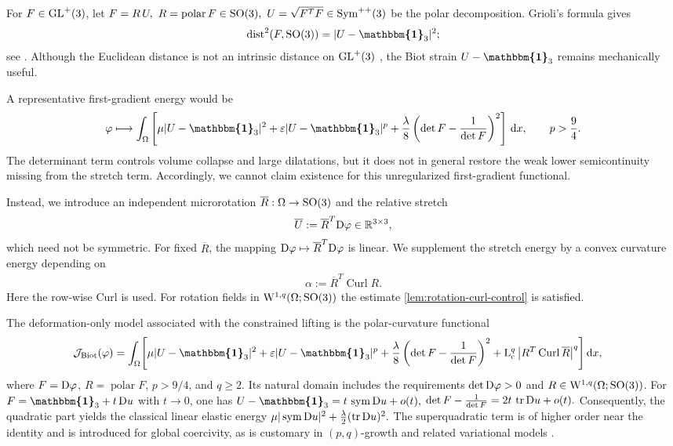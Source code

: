 \documentclass[11pt]{article}
\newcommand{\id}{{\boldsymbol{\mathbbm{1}}}}
\begin{document}
For $F\in {\rm GL}^+(3)$, let
$
F=R \,U,
\ 
R=\operatorname{polar}F\in {\rm SO}(3),
\ 
U=\sqrt{F^TF}\in\operatorname{Sym}^{++}(3)
$
be the polar decomposition. Grioli's formula gives
\begin{align}
\operatorname{dist}^2(F,{\rm SO}(3))
=
|U-\id_3|^2;
\end{align}
see \cite{Grioli40,agn_neff2014grioli}. Although the Euclidean distance is not an intrinsic distance on ${\rm GL}^+(3)$ \cite{agn_neff2014riemannian,agn_neff2015geometry,agn_martin2014minimal}, the Biot strain $U-\id_3$ remains mechanically useful.

A representative first-gradient energy would be
\begin{align}
\varphi\longmapsto
\int_\Omega
\left[
\mu|U-\id_3|^2
+
\varepsilon|U-\id_3|^p
+
\frac{\lambda}{8}
\left(\det F-\frac1{\det F}\right)^2
\right]\,\mathrm dx,
\qquad p>\frac94. 
\end{align}
The determinant term controls volume collapse and large dilatations, but it does not in general restore the weak lower semicontinuity missing from the stretch term. Accordingly, we cannot claim existence for this unregularized first-gradient functional.

Instead, we introduce an independent microrotation $\overline  R :\Omega\to {\rm SO}(3)$ and the relative stretch
\begin{align}
\overline  U := \overline R ^T{\rm D}\varphi\in\mathbb R^{3\times3},
\end{align}
which need not be symmetric. For fixed $ \overline R $, the mapping ${\rm D}\varphi\mapsto \overline R ^T{\rm D}\varphi$ is linear. We supplement the stretch energy by a convex curvature energy depending on
\begin{align}
\alpha:= \overline R ^T\operatorname{Curl}  R .
\end{align}
Here the row-wise Curl is used. For rotation fields  in ${\rm W}^{1,q}(\Omega; {\rm SO}(3))$ the estimate \eqref{lem:rotation-curl-control} is satisfied.

The deformation-only model associated with the constrained lifting is the polar-curvature functional
\begin{align}
\label{eq:polar-prototype}
\mathcal J_{\rm Biot}(\varphi)
=
\int_\Omega
\Biggl[
&\mu|U-\id_3|^2
+
\varepsilon|U-\id_3|^p
+
\frac{\lambda}{8}
\left(\det F-\frac1{\det F}\right)^2
+{\rm L}_{\rm c}^q 
\left|R ^T\operatorname{Curl}\overline R \right|^q
\Biggr] \,\mathrm dx,
\end{align}
where $F={\rm D}\varphi$, $R=\operatorname{polar}F$, $p>9/4$, and $q\geq 2$. Its natural domain includes the requirements $\det{\rm D}\varphi>0$ and $R\in  {\rm W}^{1,q}(\Omega;{\rm SO}(3))$. For $F=\id_3+t\,{\rm D}u$ with $t\to0$, one has
$
U-\id_3
=
t\,\operatorname{sym}{\rm D}u+o(t),
$ $
\det F-\frac{1}{\det F}
=
2t\,\operatorname{tr}{\rm D}u+o(t).
$
Consequently, the quadratic part yields the classical linear elastic energy
$
\mu|\operatorname{sym}{\rm D}u|^2
+
\frac{\lambda}{2}(\operatorname{tr}{\rm D}u)^2.
$ The superquadratic term is of higher order near the identity and is introduced for global coercivity, as is customary in $(p,q)$-growth and related variational models \cite{Ogden72a,Ogden83,Marcellini1,Marcellini2}.
\end{document}
